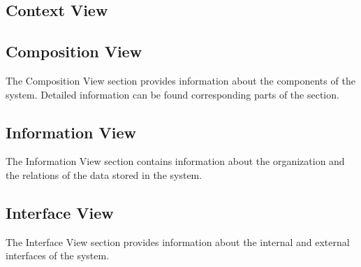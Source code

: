 \subsection{Context View}


\subsection{Composition View}
The Composition View section provides information about the components of the system. Detailed information can be found corresponding parts of the section.


\subsection{Information View}
The Information View section contains information about the organization and the relations of the data stored in the system.


\subsection{Interface View}
The Interface View section provides information about the internal and external interfaces of the system.
